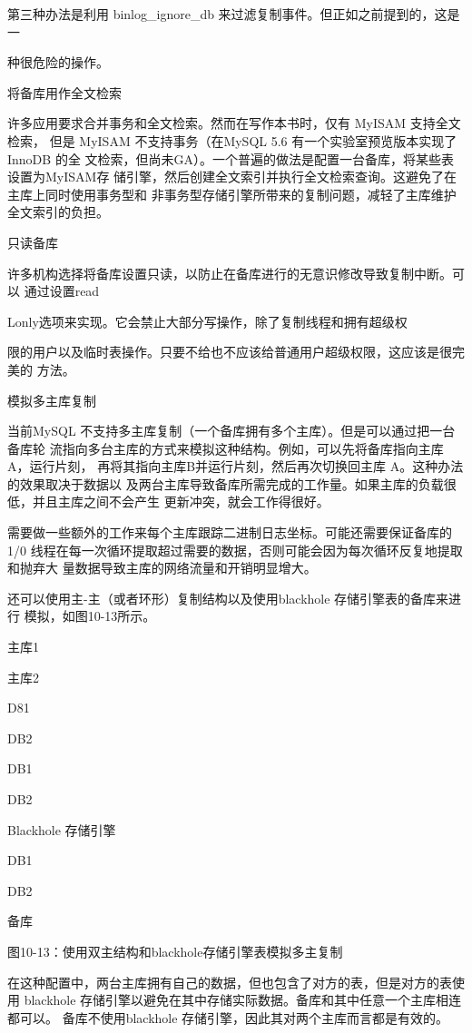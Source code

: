 第三种办法是利用 binlog\_ignore\_db 来过滤复制事件。但正如之前提到的，这是一

种很危险的操作。

将备库用作全文检索

许多应用要求合并事务和全文检索。然而在写作本书时，仅有 MyISAM 支持全文检索，
但是 MyISAM 不支持事务（在MySQL 5.6 有一个实验室预览版本实现了InnoDB 的全
文检索，但尚未GA）。一个普遍的做法是配置一台备库，将某些表设置为MyISAM存
储引擎，然后创建全文索引并执行全文检索查询。这避免了在主库上同时使用事务型和
非事务型存储引擎所带来的复制问题，减轻了主库维护全文索引的负担。

只读备库

许多机构选择将备库设置只读，以防止在备库进行的无意识修改导致复制中断。可以
通过设置read

Lonly选项来实现。它会禁止大部分写操作，除了复制线程和拥有超级权

限的用户以及临时表操作。只要不给也不应该给普通用户超级权限，这应该是很完美的
方法。

模拟多主库复制

当前MySQL 不支持多主库复制（一个备库拥有多个主库）。但是可以通过把一台备库轮
流指向多台主库的方式来模拟这种结构。例如，可以先将备库指向主库A，运行片刻，
再将其指向主库B并运行片刻，然后再次切换回主库 A。这种办法的效果取决于数据以
及两台主库导致备库所需完成的工作量。如果主库的负载很低，并且主库之间不会产生
更新冲突，就会工作得很好。

需要做一些额外的工作来每个主库跟踪二进制日志坐标。可能还需要保证备库的1/0
线程在每一次循环提取超过需要的数据，否则可能会因为每次循环反复地提取和抛弃大
量数据导致主库的网络流量和开销明显增大。

还可以使用主-主（或者环形）复制结构以及使用blackhole 存储引擎表的备库来进行
模拟，如图10-13所示。

主库1

主库2

D81

DB2

DB1

DB2

Blackhole 存储引擎

DB1

DB2

备库

图10-13：使用双主结构和blackhole存储引擎表模拟多主复制

在这种配置中，两台主库拥有自己的数据，但也包含了对方的表，但是对方的表使用
blackhole 存储引擎以避免在其中存储实际数据。备库和其中任意一个主库相连都可以。
备库不使用blackhole 存储引擎，因此其对两个主库而言都是有效的。

